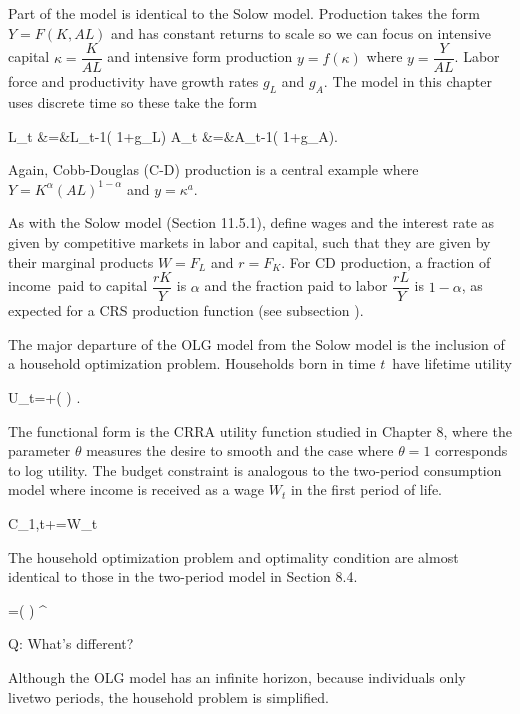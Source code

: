 ﻿\documentclass[oneside]{book}
\begin{document}
Part of the model is identical to the Solow model. Production takes the form $Y=F( K,AL) $ and has constant returns to scale so we can focus on intensive capital $\kappa =\dfrac{K}{AL}$ and intensive form production $
y=f( \kappa ) $ where $y =\dfrac{Y}{AL}$. Labor force and productivity have growth rates $g_{L}$ and $g_{A}$. The model in this
chapter uses discrete time so these take the form



L_{t} &=&L_{t-1}( 1+g_{L})
A_{t} &=&A_{t-1}( 1+g_{A}).


Again, Cobb-Douglas (C-D) production is a central example where $Y=K^{\alpha
}( AL) ^{1-\alpha }$ and $y=\kappa ^{a}$.

As with the Solow model (Section 11.5.1), define wages and the interest rate as given by competitive markets in labor and capital, such that they are given by their marginal products $W=F_{L}$ and $r=F_{K}$. For CD production, a fraction of income\ paid to capital $\dfrac{rK}{Y}$ is $\alpha $ and the
fraction paid to labor $\dfrac{rL}{Y}$ is $1-\alpha $, as expected for a CRS production function (see subsection ).

The major departure of the OLG model from the Solow model is the inclusion of a household optimization problem. Households born in time $t$\ have lifetime utility



U_{t}=+( )
.


The functional form is the CRRA utility function studied in Chapter 8, where the parameter $\theta $ measures the desire to smooth and the case where $\theta =1$ corresponds to log utility. The budget constraint is analogous to the two-period consumption model where income is received as a wage $W_{t}$ in the first period of life.



C_{1,t}+=W_{t}


The household optimization problem and optimality condition are almost identical to those in the two-period model in Section 8.4.



=( ) ^{}




Q: What's different?

Although the OLG model has an infinite horizon, because individuals only livetwo periods, the household problem is simplified.
\end{document}
